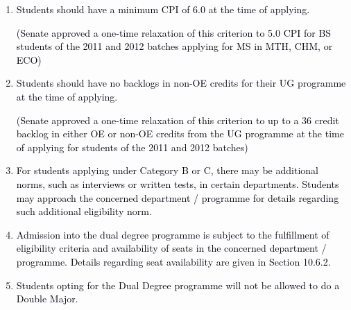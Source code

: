 \documentclass[12pt]{article}
\begin{document}
\vspace{\baselineskip}
\begin{enumerate}
	\item {\fontsize{10pt}{12.0pt}\selectfont \textcolor[HTML]{00000A}{Students should have a minimum CPI of 6.0 at the time of applying.}\par}\par


\vspace{\baselineskip}
{\fontsize{10pt}{12.0pt}\selectfont \textcolor[HTML]{00000A}{(Senate approved a one-time relaxation of this criterion to 5.0 CPI for BS students of the 2011 and 2012 batches applying for MS in MTH, CHM, or ECO)}\par}\par


\vspace{\baselineskip}
	\item {\fontsize{10pt}{12.0pt}\selectfont \textcolor[HTML]{00000A}{Students should have no backlogs in non-OE credits for their UG programme at the time of applying.}\par}\par


\vspace{\baselineskip}
{\fontsize{10pt}{12.0pt}\selectfont \textcolor[HTML]{00000A}{(Senate approved a one-time relaxation of this criterion to up to a 36 credit backlog in either OE or non-OE credits from the UG programme at the time of applying for students of the 2011 and 2012 batches)}\par}\par


\vspace{\baselineskip}
	\item {\fontsize{10pt}{12.0pt}\selectfont \textcolor[HTML]{00000A}{For students applying under Category B or C, there may be additional norms, such as interviews or written tests, in certain departments. Students may approach the concerned department / programme for details regarding such additional eligibility norm.}\par}\par


\vspace{\baselineskip}
	\item {\fontsize{10pt}{12.0pt}\selectfont \textcolor[HTML]{00000A}{Admission into the dual degree programme is subject to the fulfillment of eligibility criteria and availability of seats in the concerned department / programme. Details regarding seat availability are given in Section 10.6.2.}\par}\par


\vspace{\baselineskip}
	\item {\fontsize{10pt}{12.0pt}\selectfont \textcolor[HTML]{00000A}{Students opting for the Dual Degree programme will not be allowed to do a Double Major.}\par}
\end{enumerate}\par
\end{document}
